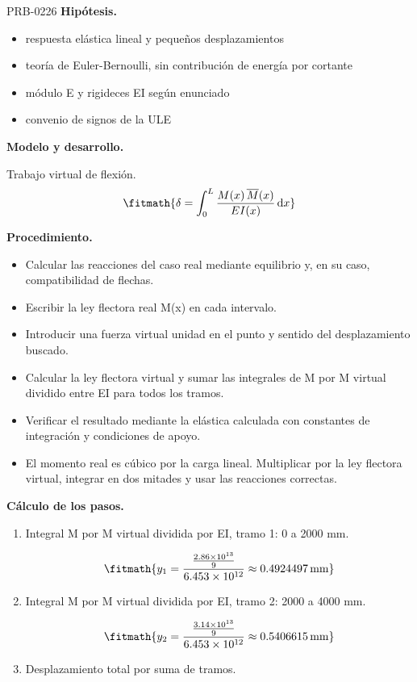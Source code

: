 \begin{studiumworked}{PRB-0226}
\textbf{Hipótesis.}\begin{itemize}\item respuesta elástica lineal y pequeños desplazamientos
\item teoría de Euler-Bernoulli, sin contribución de energía por cortante
\item módulo E y rigideces EI según enunciado
\item convenio de signos de la ULE\end{itemize}

\textbf{Modelo y desarrollo.}

Trabajo virtual de flexión.\[\fitmath{\delta = \int_{0}^{L}\frac{M(x)\,\overline{M}(x)}{E I(x)}\,\mathrm{d}x}\]

\textbf{Procedimiento.}\begin{itemize}\item Calcular las reacciones del caso real mediante equilibrio y, en su caso, compatibilidad de flechas.
\item Escribir la ley flectora real M(x) en cada intervalo.
\item Introducir una fuerza virtual unidad en el punto y sentido del desplazamiento buscado.
\item Calcular la ley flectora virtual y sumar las integrales de M por M virtual dividido entre EI para todos los tramos.
\item Verificar el resultado mediante la elástica calculada con constantes de integración y condiciones de apoyo.
\item El momento real es cúbico por la carga lineal. Multiplicar por la ley flectora virtual, integrar en dos mitades y usar las reacciones correctas.\end{itemize}

\textbf{Cálculo de los pasos.}

\begin{enumerate}

\item Integral M por M virtual dividida por EI, tramo 1: 0 a 2000 mm.

\[\fitmath{y_{1}=\frac{\frac{2.86\times10^{13}}{9}}{6.453\times10^{12}}\approx 0.4924497\,\mathrm{mm}}\]

\item Integral M por M virtual dividida por EI, tramo 2: 2000 a 4000 mm.

\[\fitmath{y_{2}=\frac{\frac{3.14\times10^{13}}{9}}{6.453\times10^{12}}\approx 0.5406615\,\mathrm{mm}}\]

\item Desplazamiento total por suma de tramos.


\end{enumerate}
\end{studiumworked}
